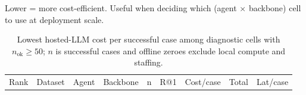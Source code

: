 Lower = more cost-efficient. Useful when deciding which (agent \ensuremath{\times} backbone) cell to use at deployment scale.

\begin{table}[t]
\centering\scriptsize\setlength{\tabcolsep}{3.5pt}
\caption{Lowest hosted-LLM cost per successful case among diagnostic cells with \(n_{\mathrm{ok}}\geq50\); \(n\) is successful cases and offline zeroes exclude local compute and staffing.}\label{tbl:jcosteff}
\begin{tabular}{@{}
>{\raggedright\arraybackslash}p{}
  >{\raggedright\arraybackslash}p{}
  >{\raggedright\arraybackslash}p{}
  >{\raggedright\arraybackslash}p{}
  >{\raggedright\arraybackslash}p{}
  >{\raggedright\arraybackslash}p{}
  >{\raggedright\arraybackslash}p{}
  >{\raggedright\arraybackslash}p{}
  >{\raggedright\arraybackslash}p{}@{}}
\toprule
\begin{minipage}[b]{\linewidth}\raggedright
Rank
\end{minipage} & \begin{minipage}[b]{\linewidth}\raggedright
Dataset
\end{minipage} & \begin{minipage}[b]{\linewidth}\raggedright
Agent
\end{minipage} & \begin{minipage}[b]{\linewidth}\raggedright
Backbone
\end{minipage} & \begin{minipage}[b]{\linewidth}\raggedright
n
\end{minipage} & \begin{minipage}[b]{\linewidth}\raggedright
R@1
\end{minipage} & \begin{minipage}[b]{\linewidth}\raggedright
Cost/case
\end{minipage} & \begin{minipage}[b]{\linewidth}\raggedright
Total
\end{minipage} & \begin{minipage}[b]{\linewidth}\raggedright
Lat/case
\end{minipage} \\

\end{tabular}
\end{table}
